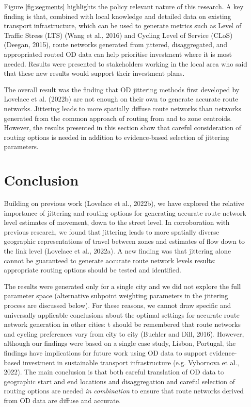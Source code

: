\documentclass{isprs} %
\begin{document}
Figure \ref{fig:segments} highlights the policy relevant nature of this research.
A key finding is that, combined with local knowledge and detailed data on existing transport infrastructure, which can be used to generate metrics such as Level of Traffic Stress (LTS) (Wang et al., 2016) and Cycling Level of Service (CLoS) (Deegan, 2015), route networks generated from jittered, disaggregated, and appropriated routed OD data can help prioritise investment where it is most needed.
Results were presented to stakeholders working in the local area who said that these new results would support their investment plans.

The overall result was the finding that OD jittering methods first developed by Lovelace et al. (2022b) are not enough on their own to generate accurate route networks.
Jittering leads to more spatially diffuse route networks than networks generated from the common approach of routing from and to zone centroids.
However, the results presented in this section show that careful consideration of routing options is needed in addition to evidence-based selection of jittering parameters.

\hypertarget{conclusion}{%
\section{Conclusion}\label{conclusion}}

Building on previous work (Lovelace et al., 2022b), we have explored the relative importance of jittering and routing options for generating accurate route network level estimates of movement, down to the street level.
In corroboration with previous research, we found that jittering leads to more spatially diverse geographic representations of travel between zones and estimates of flow down to the link level (Lovelace et al., 2022a).
A new finding was that jittering alone cannot be guaranteed to generate accurate route network levels results: appropriate routing options should be tested and identified.

The results were generated only for a single city and we did not explore the full parameter space (alternative subpoint weighting parameters in the jittering process are discussed below).
For these reasons, we cannot draw specific and universally applicable conclusions about the optimal settings for accurate route network generation in other cities: t should be remembered that route networks and cycling preferences vary from city to city (Buehler and Dill, 2016).
However, although our findings were based on a single case study, Lisbon, Portugal, the findings have implications for future work using OD data to support evidence-based investment in sustainable transport infrastructure (e.g. Vybornova et al., 2022).
The main conclusion is that both careful translation of OD data to geographic start and end locations and disaggregation and careful selection of routing options are needed \emph{in combination} to ensure that route networks derived from OD data are diffuse and accurate.
\end{document}
